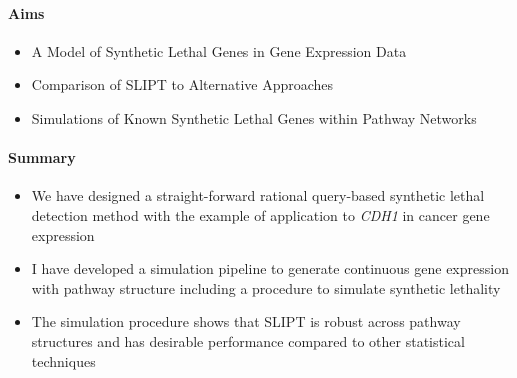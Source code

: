 \clearpage

\paragraph{Aims}

  \begin{itemize}
   \item A Model of Synthetic Lethal Genes in Gene Expression Data
   
   \bigskip
   
   \item Comparison of SLIPT to Alternative Approaches
   
   \bigskip
   
   \item Simulations of Known Synthetic Lethal Genes within Pathway Networks
      
  \end{itemize}

\paragraph{Summary}

    \begin{itemize}
      \item We have designed a straight-forward rational query-based synthetic lethal detection method with the example of application to \textit{CDH1} in cancer gene expression
      
      \bigskip
      
      \item I have developed a simulation pipeline to generate continuous gene expression with pathway structure including a procedure to simulate synthetic lethality 
      
      \bigskip
      
      \item The simulation procedure shows that SLIPT is robust across pathway structures and has desirable performance compared to other statistical techniques 
      \end{itemize}